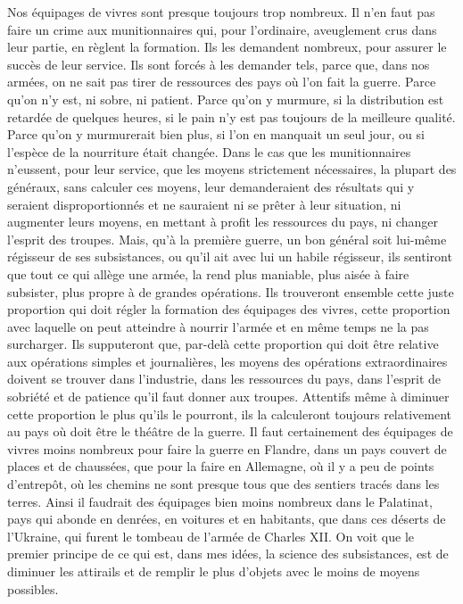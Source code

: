\documentclass[french,twoside]{book} %
\begin{document}
Nos équipages de vivres sont presque toujours trop nombreux. Il n’en faut pas faire un crime aux munitionnaires qui, pour l’ordinaire, aveuglement crus dans leur partie, en règlent la formation. Ils les demandent nombreux, pour assurer le succès de leur service. Ils sont forcés à les demander tels, parce que, dans nos armées, on ne sait pas tirer de ressources des pays où l’on fait la guerre. Parce qu’on n’y est, ni sobre, ni patient. Parce qu’on y murmure, si la distribution est retardée de quelques heures, si le pain n’y est pas toujours de la meilleure qualité. Parce qu’on y murmurerait bien plus, si l’on en manquait un seul jour, ou si l’espèce de la nourriture était changée. Dans le cas que les munitionnaires n’eussent, pour leur service, que les moyens strictement nécessaires, la plupart des généraux, sans calculer ces moyens, leur demanderaient des résultats qui y seraient disproportionnés et ne sauraient ni se prêter à leur situation, ni augmenter leurs moyens, en mettant à profit les ressources du pays, ni changer l’esprit des troupes. Mais, qu’à la première guerre, un bon général soit lui-même régisseur de ses subsistances, ou qu’il ait avec lui un habile régisseur, ils sentiront que tout ce qui allège une armée, la rend plus maniable, plus aisée à faire subsister, plus propre à de grandes opérations. Ils trouveront ensemble cette juste proportion qui doit régler la formation des équipages des vivres, cette proportion avec laquelle on peut atteindre à nourrir l’armée et en même temps ne la pas surcharger. Ils supputeront que, par-delà cette proportion qui doit être relative aux opérations simples et journalières, les moyens des opérations extraordinaires doivent se trouver dans l’industrie, dans les ressources du pays, dans l’esprit de sobriété et de patience qu’il faut donner aux troupes. Attentifs même à diminuer cette proportion le plus qu’ils le pourront, ils la calculeront toujours relativement au pays où doit être le théâtre de la guerre. Il faut certainement des équipages de vivres moins nombreux pour faire la guerre en Flandre, dans un pays couvert de places et de chaussées, que pour la faire en Allemagne, où il y a peu de points d’entrepôt, où les chemins ne sont presque tous que des sentiers tracés dans les terres. Ainsi il faudrait des équipages bien moins nombreux dans le Palatinat, pays qui abonde en denrées, en voitures et en habitants, que dans ces déserts de l’Ukraine, qui furent le tombeau de l’armée de Charles XII. On voit que le premier principe de ce qui est, dans mes idées, la science des subsistances, est de diminuer les attirails et de remplir le plus d’objets avec le moins de moyens possibles.\par
\end{document}
